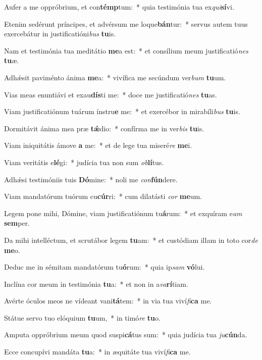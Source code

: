\item Aufer a me oppróbrium, et con\textbf{témp}tum:~* quia testimónia tua ex\textit{qui}\textbf{sí}vi.
\item Etenim sedérunt príncipes, et advérsum me loque\textbf{bán}tur:~* servus autem tuus exercebátur in justificatióni\textit{bus} \textbf{tu}is.
\item Nam et testimónia tua meditátio \textbf{me}a est:~* et consílium meum justificatió\textit{nes} \textbf{tu}æ.
\item Adhǽsit paviménto ánima \textbf{me}a:~* vivífica me secúndum ver\textit{bum} \textbf{tu}um.
\item Vias meas enuntiávi et exau\textbf{dís}ti me:~* doce me justificatió\textit{nes} \textbf{tu}as.
\item Viam justificatiónum tuárum ínstru\textbf{e} me:~* et exercébor in mirabíli\textit{bus} \textbf{tu}is.
\item Dormitávit ánima mea præ \textbf{tǽ}dio:~* confírma me in ver\textit{bis} \textbf{tu}is.
\item Viam iniquitátis ámove \textbf{a} me:~* et de lege tua miseré\textit{re} \textbf{me}i.
\item Viam veritátis e\textbf{lé}gi:~* judícia tua non sum \textit{ob}\textbf{lí}tus.
\item Adhǽsi testimóniis tuis \textbf{Dó}mine:~* noli me \textit{con}\textbf{fún}dere.
\item Viam mandatórum tuórum cu\textbf{cúr}ri:~* cum dilatásti \textit{cor} \textbf{me}um.
\item Legem pone mihi, Dómine, viam justificatiónum tu\textbf{á}rum:~* et exquíram e\textit{am} \textbf{sem}per.
\item Da mihi intelléctum, et scrutábor legem \textbf{tu}am:~* et custódiam illam in toto cor\textit{de} \textbf{me}o.
\item Deduc me in sémitam mandatórum tu\textbf{ó}rum:~* quia ip\textit{sam} \textbf{vó}lui.
\item Inclína cor meum in testimónia \textbf{tu}a:~* et non in a\textit{va}\textbf{rí}tiam.
\item Avérte óculos meos ne vídeant vani\textbf{tá}tem:~* in via tua viví\textit{fi}\textbf{ca} me.
\item Státue servo tuo elóquium \textbf{tu}um,~* in timó\textit{re} \textbf{tu}o.
\item Amputa oppróbrium meum quod suspi\textbf{cá}tus sum:~* quia judícia tua \textit{ju}\textbf{cún}da.
\item Ecce concupívi mandáta \textbf{tu}a:~* in æquitáte tua viví\textit{fi}\textbf{ca} me.
